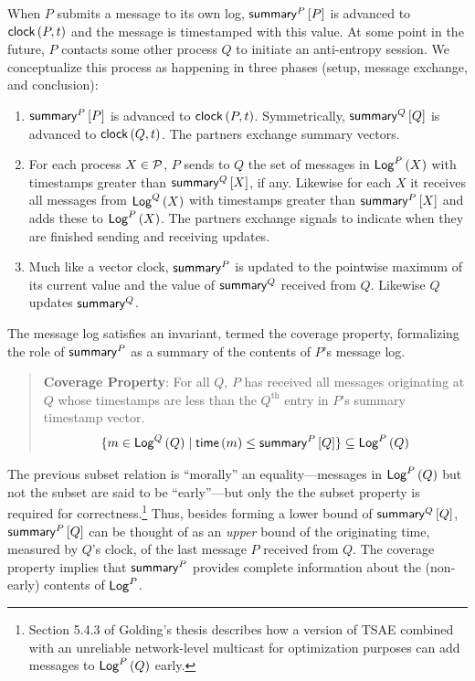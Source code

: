 \documentclass[]             %
{NASA}                       %
\theoremstyle{definition}
\begin{document}
When $P$ submits a message to its own log, $\mathsf{summary}^{P}\left[P\right]$ is
advanced to $\mathsf{clock}\left(P, t\right)$ and the message is timestamped with this
value. At some point in the future, $P$ contacts some other process
$Q$ to initiate an anti-entropy session. We conceptualize this process
as happening in three phases (setup, message exchange, and conclusion):
\begin{enumerate}
\item $\mathsf{summary}^{P}\left[P\right]$ is advanced to $\mathsf{clock}\left(P, t\right)$. Symmetrically,
  $\mathsf{summary}^{Q}\left[Q\right]$ is advanced to $\mathsf{clock}\left(Q, t\right)$. The partners exchange summary vectors.
\item For each process $X \in \mathcal{P}$, $P$ sends to $Q$ the set of
  messages in $\mathsf{Log}^{P}\left(X\right)$ with timestamps greater than
  $\mathsf{summary}^{Q}\left[X\right]$, if any. Likewise for each $X$ it receives all messages
  from $\mathsf{Log}^{Q}\left(X\right)$ with timestamps greater than $\mathsf{summary}^{P}\left[X\right]$ and
  adds these to $\mathsf{Log}^{P}\left(X\right)$. The partners exchange signals to indicate
  when they are finished sending and receiving updates.
\item Much like a vector clock, $\mathsf{summary}^{P}$ is updated to the
  pointwise maximum of its current value and the value of
  $\mathsf{summary}^{Q}$ received from $Q$. Likewise $Q$ updates
  $\mathsf{summary}^{Q}$.
\end{enumerate}
The message log satisfies an invariant, termed the coverage property,
formalizing the role of $\mathsf{summary}^{P}$ as a summary of the contents
of $P$'s message log.
\begin{quote}
  \textbf{Coverage Property}: For all $Q$, $P$ has received
  all messages originating at $Q$ whose timestamps are less than the
  $Q^\textrm{th}$ entry in $P$'s summary timestamp vector.
  \[ \{m \in \mathsf{Log}^{Q}\left(Q\right) \mid \mathsf{time}\left(m\right) \leq \mathsf{summary}^{P}\left[Q\right] \} \subseteq \mathsf{Log}^{P}\left(Q\right) \]
\end{quote}
The previous subset relation is ``morally'' an equality---messages in
$\mathsf{Log}^{P}\left(Q\right)$ but not the subset are said to be ``early''---but only the
the subset property is required for correctness.\footnote{Section
  5.4.3 of Golding's thesis describes how a version of TSAE
  combined with an unreliable network-level multicast for optimization purposes can add
  messages to $\mathsf{Log}^{P}\left(Q\right)$ early.} Thus, besides forming a lower
bound of $\mathsf{summary}^{Q}\left[Q\right]$, $\mathsf{summary}^{P}\left[Q\right]$ can be thought of as an
\emph{upper} bound of the originating time, measured by $Q$'s clock,
of the last message $P$ received from $Q$. The coverage property
implies that $\mathsf{summary}^{P}$ provides complete information about the
(non-early) contents of $\mathsf{Log}^{P}$.
\end{document}
